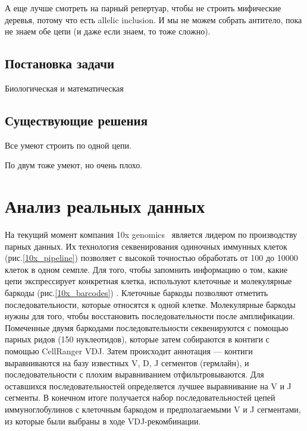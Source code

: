 \documentclass{spbau-diploma}
\begin{document}
А еще лучше смотреть на парный репертуар, чтобы не строить мифические деревья, потому что есть allelic inclusion.
И мы не можем собрать антитело, пока не знаем обе цепи (и даже если знаем, то тоже сложно).



\subsection{Постановка задачи}

Биологическая и математическая




\subsection{Существующие решения}

Все умеют строить по одной цепи.


По двум тоже умеют, но очень плохо.


\section{Анализ реальных данных}

На текущий момент компания 10x genomics~\cite{pmid28091601} является лидером по производству парных данных.
Их технология секвенирования одиночных иммунных клеток (рис.\ref{10x_pipeline}) позволяет с высокой точностью обработать от 100 до 10000 клеток в одном семпле.
Для того, чтобы запомнить информацию о том, какие цепи экспрессирует конкретная клетка, используют клеточные и молекулярные баркоды (рис.\ref{10x_barcodes}) .
Клеточные баркоды позволяют отметить последовательности, которые относятся к одной клетке.
 Молекулярные баркоды нужны для того, чтобы восстановить последовательности после амплификации.
 Помеченные двумя баркодами последовательности секвенируются с помощью парных ридов (150 нуклеотидов), которые затем собираются в контиги с помощью CellRanger VDJ.
Затем происходит аннотация --- контиги выравниваются на базу известных V, D, J сегментов (гермлайн), и последовательности с плохим выравниванием отфильтровываются.
Для оставшихся последовательностей определяется лучшее выравнивание на V и J сегменты.
В конечном итоге получается набор последовательностей цепей иммуноглобулинов с клеточным баркодом и предполагаемыми V и J сегментами, из которые были выбраны в ходе VDJ-рекомбинации.
\end{document}
